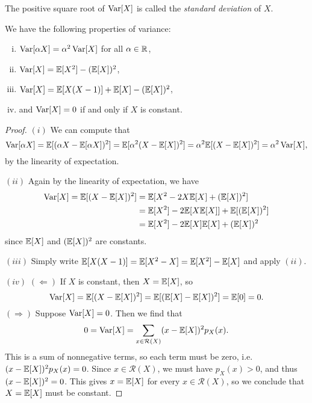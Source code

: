 \begin{definition}
  The positive square root of $\operatorname{Var}[X]$ is
  called the \emph{standard deviation} of $X$.
\end{definition}

\begin{prop}
  We have the following properties of variance:
  \begin{enumerate}[(i)]
    \item $\operatorname{Var}[\alpha X] = \alpha^2 \operatorname{Var}[X]$
      for all $\alpha \in \mathbb{R}$,
    \item $\operatorname{Var}[X] = \mathbb{E}[X^2] - (\mathbb{E}[X])^2$,
    \item $\operatorname{Var}[X] = \mathbb{E}[X(X - 1)] + \mathbb{E}[X] - (\mathbb{E}[X])^2$,
    \item and $\operatorname{Var}[X] = 0$ if and only if
      $X$ is constant.
  \end{enumerate}
\end{prop}

\begin{proof}
  $(i)$ We can compute that
  \[
    \operatorname{Var}[\alpha X] = \mathbb{E}[(\alpha X - \mathbb{E}[\alpha X])^2]
    = \mathbb{E}[\alpha^2 (X - \mathbb{E}[X])^2]
    = \alpha^2 \mathbb{E}[(X - \mathbb{E}[X])^2]
    = \alpha^2 \operatorname{Var}[X],
  \]
  by the linearity of expectation.

  $(ii)$ Again by the linearity of expectation, we have
  \begin{align*}
    \operatorname{Var}[X] = \mathbb{E}[(X - \mathbb{E}[X])^2]
    &= \mathbb{E}[X^2 - 2X\mathbb{E}[X] + (\mathbb{E}[X])^2] \\
    &= \mathbb{E}[X^2] - 2\mathbb{E}[X \mathbb{E}[X]] + \mathbb{E}[(\mathbb{E}[X])^2] \\
    &= \mathbb{E}[X^2] - 2\mathbb{E}[X] \mathbb{E}[X] + (\mathbb{E}[X])^2
  \end{align*}
  since $\mathbb{E}[X]$ and $(\mathbb{E}[X])^2$ are constants.

  $(iii)$ Simply write
  $\mathbb{E}[X(X - 1)] = \mathbb{E}[X^2 - X] = \mathbb{E}[X^2] - \mathbb{E}[X]$
  and apply $(ii)$.

  $(iv)$ $(\Leftarrow)$ If $X$ is constant, then
  $X = \mathbb{E}[X]$, so
  \[
    \operatorname{Var}[X] = \mathbb{E}[(X - \mathbb{E}[X])^2] = \mathbb{E}[(\mathbb{E}[X] - \mathbb{E}[X])^2]
    = \mathbb{E}[0] = 0.
  \]
    $(\Rightarrow)$ Suppose $\operatorname{Var}[X] = 0$. Then we find that
    \[
      0 = \operatorname{Var}[X]
      = \sum_{x \in \mathcal{R}(X)} (x - \mathbb{E}[X])^2 p_X(x).
    \]
    This is a sum of nonnegative terms, so
    each term must be zero, i.e. $(x - \mathbb{E}[X])^2 p_X(x) = 0$.
    Since $x \in \mathcal{R}(X)$, we must have
    $p_X(x) > 0$, and thus $(x - \mathbb{E}[X])^2 = 0$.
    This gives $x = \mathbb{E}[X]$ for every $x \in \mathcal{R}(X)$,
    so we conclude that $X = \mathbb{E}[X]$ must be constant.
\end{proof}

